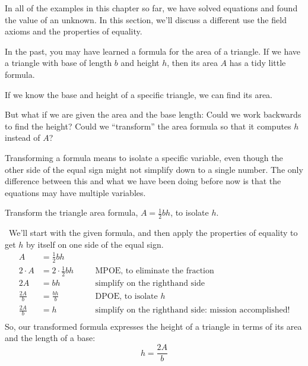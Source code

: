 In all of the examples in this chapter so far, we have solved equations and found the value of an unknown. In this section, we'll discuss a different use the field axioms and the properties of equality.

In the past, you may have learned a formula for the area of a triangle. If we have a triangle with base of length $b$ and height $h$, then its area $A$ has a tidy little formula.
\begin{center}
\end{center}
If we know the base and height of a specific triangle, we can find its area.
\begin{center}
\end{center}
But what if we are given the area and the base length: Could we work backwards to find the height? Could we ``transform'' the area formula so that it computes $h$ instead of $A$?

Transforming a formula means to isolate a specific variable, even though the other side of the equal sign might not simplify down to a single number. The only difference between this and what we have been doing before now is that the equations may have multiple variables.

\begin{boxedex}
Transform the triangle area formula, $A = \frac{1}{2}bh$, to isolate $h$.

\exsoln\ We'll start with the given formula, and then apply the properties of equality to get $h$ by itself on one side of the equal sign.
\[\begin{aligned}
A &= \frac{1}{2}bh \\[1ex]
2 \cdot A &= 2 \cdot \frac{1}{2} bh
&& \quad\text{MPOE, to eliminate the fraction}\\[1ex]
2A &= bh
&& \quad\text{simplify on the righthand side}\\[1ex]
\frac{2 A}{b} &= \frac{bh}{b}
&& \quad\text{DPOE, to isolate $h$}\\[1ex]
\frac{2 A}{b} &= h
&& \quad\text{simplify on the righthand side: mission accomplished!}\\[1ex]
\end{aligned}\]
So, our transformed formula expresses the height of a triangle in terms of its area and the length of a base: \[h = \frac{2A}{b}\]
\end{boxedex}

